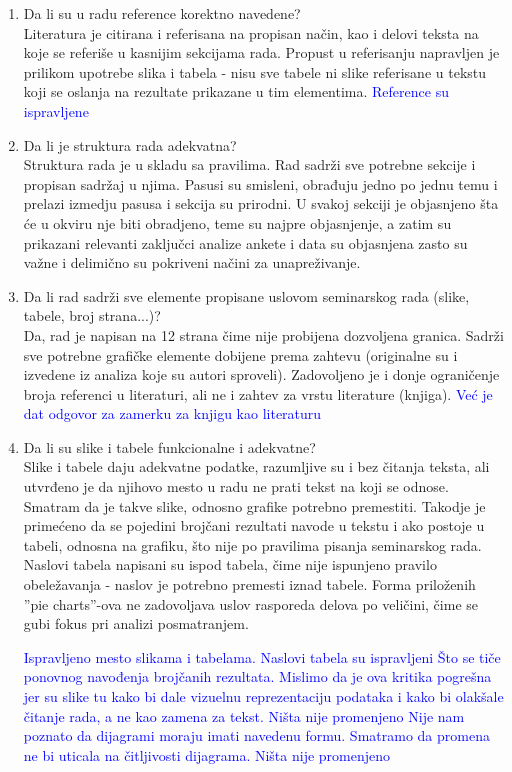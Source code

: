 \documentclass[a4paper]{report}
\newcommand{\odgovor}[1]{\textcolor{blue}{#1}}
\begin{document}
\begin{enumerate}
 \item Da li su u radu reference korektno navedene?\\
 Literatura je citirana i referisana na propisan način, kao i delovi teksta na koje se referiše u kasnijim sekcijama rada. Propust u referisanju napravljen je prilikom upotrebe slika i tabela - nisu sve tabele ni slike referisane u tekstu koji se oslanja na rezultate prikazane u tim elementima.
 \odgovor{Reference su ispravljene}
 
 \item Da li je struktura rada adekvatna?\\
 Struktura rada je u skladu sa pravilima. Rad sadrži sve potrebne sekcije i propisan sadržaj u njima. Pasusi su smisleni, obrađuju jedno po jednu temu i prelazi izmedju pasusa i sekcija su prirodni. U svakoj sekciji je objasnjeno šta će u okviru nje biti obradjeno, teme su najpre objasnjenje, a zatim su prikazani relevanti zaključci analize ankete i data su objasnjena zasto su važne i delimično su pokriveni načini za unapreživanje.
 
 \item Da li rad sadrži sve elemente propisane uslovom seminarskog rada (slike, tabele, broj strana...)?\\
 Da, rad je napisan na 12 strana čime nije probijena dozvoljena granica. Sadrži sve potrebne grafičke elemente dobijene prema zahtevu (originalne su i izvedene iz analiza koje su autori sproveli). Zadovoljeno je i donje ograničenje broja referenci u literaturi, ali ne i zahtev za vrstu literature (knjiga).
 \odgovor {Već je dat odgovor za zamerku za knjigu kao literaturu}
 
 \item Da li su slike i tabele funkcionalne i adekvatne?\\
 Slike i tabele daju adekvatne podatke, razumljive su i bez čitanja teksta, ali utvrđeno je da njihovo mesto u radu ne prati tekst na koji se odnose. Smatram da je takve slike, odnosno grafike potrebno premestiti. Takodje je primećeno da se pojedini brojčani rezultati navode u tekstu i ako postoje u tabeli, odnosna na grafiku, što nije po pravilima pisanja seminarskog rada. Naslovi tabela napisani su ispod tabela, čime nije ispunjeno pravilo obeležavanja - naslov je potrebno premesti iznad tabele.
 Forma priloženih ''pie charts''-ova ne zadovoljava uslov rasporeda delova po veličini, čime se gubi fokus pri analizi posmatranjem.
 
 \odgovor{Ispravljeno mesto slikama i tabelama. Naslovi tabela su ispravljeni}
 \odgovor{Što se tiče ponovnog navođenja brojčanih rezultata. Mislimo da je ova kritika pogrešna jer su slike tu kako bi dale vizuelnu reprezentaciju podataka i kako bi olakšale čitanje rada, a ne kao zamena za tekst. Ništa nije promenjeno}
 \odgovor{Nije nam poznato da dijagrami moraju imati navedenu formu. Smatramo da promena ne bi uticala na čitljivosti dijagrama. Ništa nije promenjeno}
 
 \end{enumerate}
 
\end{document}
